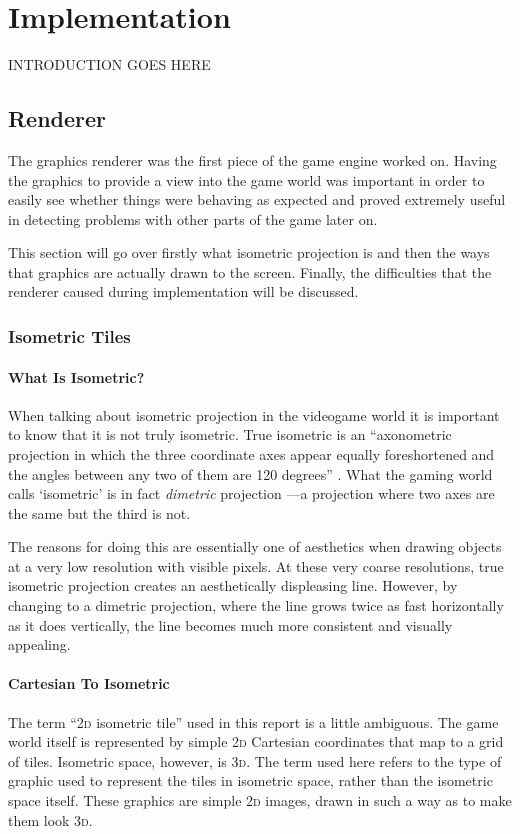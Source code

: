 \chapter{Implementation}

INTRODUCTION GOES HERE

\section{Renderer}
The graphics renderer was the first piece of the game engine worked on. Having the graphics to provide a view into the game world was important in order to easily see whether things were behaving as expected and proved extremely useful in detecting problems with other parts of the game later on.

This section will go over firstly what isometric projection is and then the ways that graphics are actually drawn to the screen. Finally, the difficulties that the renderer caused during implementation will be discussed.

\subsection{Isometric Tiles}

\subsubsection{What Is Isometric?}
When talking about isometric projection in the videogame world it is important to know that it is not truly isometric. True isometric is an ``axonometric projection in which the three coordinate axes appear equally foreshortened and the angles between any two of them are 120 degrees'' . What the gaming world calls `isometric' is in fact \textit{dimetric} projection ---a projection where two axes are the same but the third is not.

The reasons for doing this are essentially one of aesthetics when drawing objects at a very low resolution with visible pixels. At these very coarse resolutions, true isometric projection creates an aesthetically displeasing line. However, by changing to a dimetric projection, where the line grows twice as fast horizontally as it does vertically, the line becomes much more consistent and visually appealing. 

\subsubsection{Cartesian To Isometric}
The term ``\textsc{2d} isometric tile'' used in this report is a little ambiguous. The game world itself is represented by simple \textsc{2d} Cartesian coordinates that map to a grid of tiles. Isometric space, however, is \textsc{3d}. The term used here refers to the type of graphic used to represent the tiles in isometric space, rather than the isometric space itself. These graphics are simple \textsc{2d} images, drawn in such a way as to make them look \textsc{3d}. 


